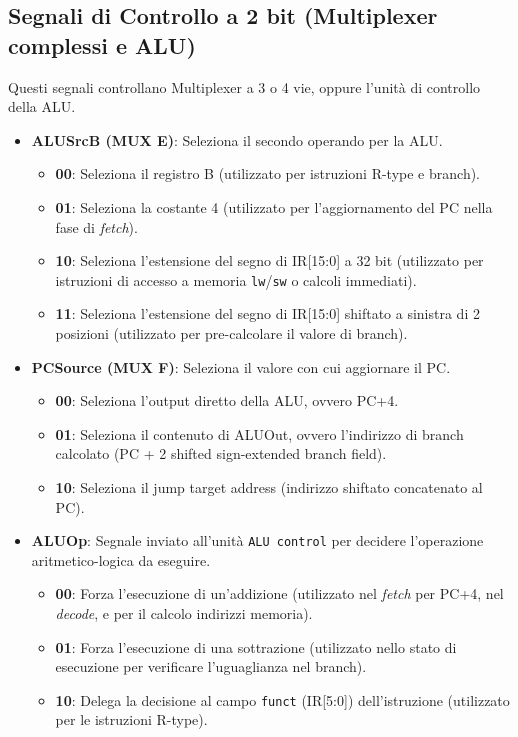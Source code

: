 \subsection{Segnali di Controllo a 2 bit (Multiplexer complessi e ALU)}
Questi segnali controllano Multiplexer a 3 o 4 vie, oppure l'unità di controllo della ALU.

\begin{itemize}
    \item \textbf{ALUSrcB (MUX E)}: Seleziona il secondo operando per la ALU.
    \begin{itemize}
        \item \textbf{00}: Seleziona il registro B (utilizzato per istruzioni R-type e branch).
        \item \textbf{01}: Seleziona la costante 4 (utilizzato per l'aggiornamento del PC nella fase di \textit{fetch}).
        \item \textbf{10}: Seleziona l'estensione del segno di IR[15:0] a 32 bit (utilizzato per istruzioni di accesso a memoria \texttt{lw}/\texttt{sw} o calcoli immediati).
        \item \textbf{11}: Seleziona l'estensione del segno di IR[15:0] shiftato a sinistra di 2 posizioni (utilizzato per pre-calcolare il valore di branch).
    \end{itemize}
    \item \textbf{PCSource (MUX F)}: Seleziona il valore con cui aggiornare il PC.
    \begin{itemize}
        \item \textbf{00}: Seleziona l'output diretto della ALU, ovvero PC+4.
        \item \textbf{01}: Seleziona il contenuto di ALUOut, ovvero l'indirizzo di branch calcolato (PC + 2 shifted sign-extended branch field).
        \item \textbf{10}: Seleziona il jump target address (indirizzo shiftato concatenato al PC).
    \end{itemize}
    \item \textbf{ALUOp}: Segnale inviato all'unità \texttt{ALU control} per decidere l'operazione aritmetico-logica da eseguire.
    \begin{itemize}
        \item \textbf{00}: Forza l'esecuzione di un'addizione (utilizzato nel \textit{fetch} per PC+4, nel \textit{decode}, e per il calcolo indirizzi memoria).
        \item \textbf{01}: Forza l'esecuzione di una sottrazione (utilizzato nello stato di esecuzione per verificare l'uguaglianza nel branch).
        \item \textbf{10}: Delega la decisione al campo \texttt{funct} (IR[5:0]) dell'istruzione (utilizzato per le istruzioni R-type).
    \end{itemize}
\end{itemize}

